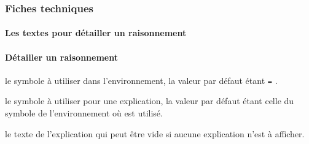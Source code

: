 \documentclass[12pt,a4paper]{article}
\begin{document}


\subsubsection{Fiches techniques}

\paragraph{Les textes pour détailler un raisonnement}







\paragraph{Détailler un raisonnement}


\IDoption{} le symbole à utiliser dans l'environnement, la valeur par défaut étant \verb+=+ .


\separation



\IDoption{} le symbole à utiliser pour une explication, la valeur par défaut étant celle du symbole de l'environnement  où  est utilisé.

\IDarg{} le texte de l'explication qui peut être vide si aucune explication n'est à afficher.
\end{document}
